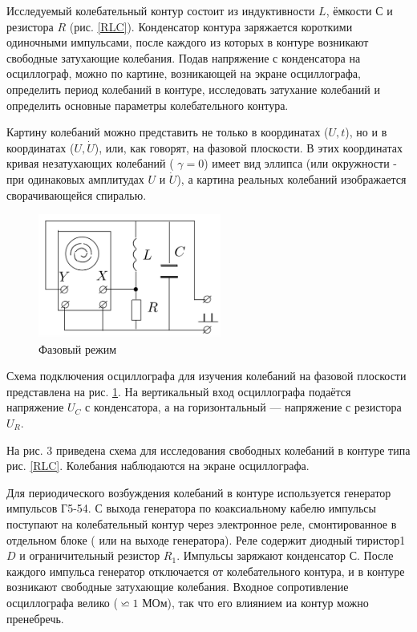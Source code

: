 \documentclass[a4paper,12pt]{article}
\begin{document}
Исследуемый колебательный контур состоит из индуктивности $ L $,
ёмкости $ С $ и резистора $ R $ (рис. \ref{RLC}). Конденсатор контура заряжается
короткими одиночными импульсами, после каждого из которых в контуре
возникают свободные затухающие колебания. Подав напряжение
с конденсатора на осциллограф, можно по картине, возникающей на
экране осциллографа, определить период колебаний в контуре, исследовать
затухание колебаний и определить основные параметры колебательного
контура.

Картину колебаний можно представить не только в координатах ($ U, t $), но и в координатах ($ U, \dot{U} $), или, как говорят, на фазовой
плоскости. В этих координатах кривая незатухающих колебаний ( $ \gamma = 0 $)
имеет вид эллипса (или окружности - при одинаковых амплитудах $ U $
и $ \dot{U} $), а картина реальных колебаний изображается сворачивающейся
спиралью. 


\begin{figure}[h]
	\includegraphics[width=6cm]{Fase.png}
	\caption{Фазовый режим}
	\label{Fase}
\end{figure}

Схема подключения осциллографа для изучения колебаний на фазовой плоскости представлена на рис. \ref{Fase}. На вертикальный вход осциллографа подаётся напряжение $ U_C $ с конденсатора, а на горизонтальный --- напряжение с резистора $ U_R $.

На рис. 3 приведена схема для исследования свободных колебаний в контуре типа рис. \ref{RLC}. Колебания наблюдаются на экране осциллографа.

Для периодического возбуждения колебаний в контуре используется
генератор импульсов Г5-54. С выхода генератора по коаксиальному кабелю импульсы поступают на колебательный контур через электронное
реле, смонтированное в отдельном блоке ( или на выходе генератора).
Реле содержит диодный тиристор1 $ D $ и ограничительный резистор $ R_1 $.
Импульсы заряжают конденсатор $ С $. После каждого импульса генератор
отключается от колебательного контура, и в контуре возникают
свободные затухающие колебания. Входное сопротивление осциллографа
велико ($ \backsimeq 1$ МОм), так что его влиянием иа контур можно пренебречь.
\end{document}

